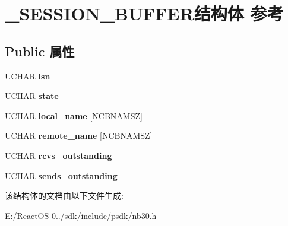 \hypertarget{struct___s_e_s_s_i_o_n___b_u_f_f_e_r}{}\section{\+\_\+\+S\+E\+S\+S\+I\+O\+N\+\_\+\+B\+U\+F\+F\+E\+R结构体 参考}
\label{struct___s_e_s_s_i_o_n___b_u_f_f_e_r}
\subsection*{Public 属性}
\begin{DoxyCompactItemize}
\item 
\mbox{\label{struct___s_e_s_s_i_o_n___b_u_f_f_e_r_a3b7426f7fd39018cecf00084c3c9ca95}} 
U\+C\+H\+AR {\bfseries lsn}
\item 
\mbox{\label{struct___s_e_s_s_i_o_n___b_u_f_f_e_r_a17dd41dbb87f7e5bd64b3aef5871c98e}} 
U\+C\+H\+AR {\bfseries state}
\item 
\mbox{\label{struct___s_e_s_s_i_o_n___b_u_f_f_e_r_a8746031a3656a76bba126ffce104ae82}} 
U\+C\+H\+AR {\bfseries local\+\_\+name} \mbox{[}N\+C\+B\+N\+A\+M\+SZ\mbox{]}
\item 
\mbox{\label{struct___s_e_s_s_i_o_n___b_u_f_f_e_r_a50dd182063310673e0dffefb7080462e}} 
U\+C\+H\+AR {\bfseries remote\+\_\+name} \mbox{[}N\+C\+B\+N\+A\+M\+SZ\mbox{]}
\item 
\mbox{\label{struct___s_e_s_s_i_o_n___b_u_f_f_e_r_aaaca4d9a4f569ef6d89a661a15dc44d3}} 
U\+C\+H\+AR {\bfseries rcvs\+\_\+outstanding}
\item 
\mbox{\label{struct___s_e_s_s_i_o_n___b_u_f_f_e_r_a9d5ab87df3afd57239126762ac5a53f4}} 
U\+C\+H\+AR {\bfseries sends\+\_\+outstanding}
\end{DoxyCompactItemize}


该结构体的文档由以下文件生成\+:\begin{DoxyCompactItemize}
\item 
E\+:/\+React\+O\+S-\/0../sdk/include/psdk/nb30.\+h\end{DoxyCompactItemize}
